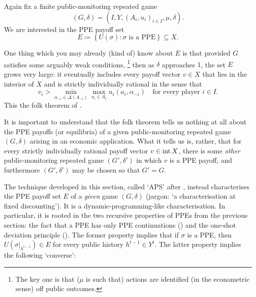 Again fix a finite public-monitoring repeated game
%
\begin{equation*}
	(G,\delta) = \left( I, Y, (A_i, u_i)_{i \in I}, \mu, \delta \right) .
\end{equation*}
%
We are interested in the PPE payoff set
%
\begin{equation*}
	E \coloneqq 
	\left\{
	U(\sigma) : \text{$\sigma$ is a PPE}
	\right\}
	\subseteq X .
\end{equation*}

One thing which you may already (kind of) know about $E$ is that provided $G$ satisfies some arguably weak conditions,%
	\footnote{The key one is that ($\mu$ is such that) actions are identified (in the econometric sense) off public outcomes.}
then as $\delta$ approaches $1$, the set $E$ grows very large: it eventually includes every payoff vector $v \in X$ that lies in the interior of $X$ and is strictly individually rational in the sense that
%
\begin{equation*}
	v_i > \min_{\alpha_{-i} \in \Delta(A_{-i})} \max_{a_i \in A_i} u_i(a_i,\alpha_{-i})
	\quad \text{for every player $i \in I$.}
\end{equation*}
%
This the folk theorem of \textcite{FudenbergLevineMaskin1994} \parencite[see][chapter~9]{MailathSamuelson2006}.

It is important to understand that the folk theorem tells us nothing at all about the PPE payoffs (or equilibria) of a given public-monitoring repeated game $(G,\delta)$ arising in an economic application. What it tells us is, rather, that for every strictly individually rational payoff vector $v \in \operatorname*{int} X$, there is some \emph{other} public-monitoring repeated game $(G',\delta')$ in which $v$ is a PPE payoff, and furthermore $(G',\delta')$ may be chosen so that $G'=G$.

The technique developed in this section, called `APS' after \textcite{AbreuPearceStacchetti1990}, instead characterises the PPE payoff set $E$ of a \emph{given} game $(G,\delta)$ (jargon: `a characterisation at fixed discounting'). It is a dynamic-programming-like characterisation. In particular, it is rooted in the two recursive properties of PPEs from the previous section: the fact that a PPE has only PPE continuations () and the one-shot deviation principle (). The former property implies that if $\sigma$ is a PPE, then $U\left( \sigma|_{h^{t-1}} \right) \in E$ for every public history $h^{t-1} \in Y^t$. The latter property implies the following `converse':

